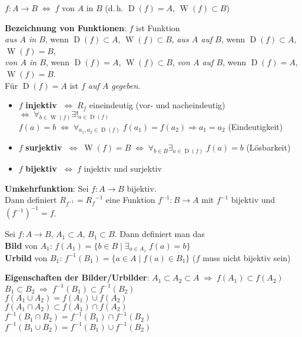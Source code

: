 $f: A \rightarrow B \;\Leftrightarrow\; f$ von $A$ in $B$
(d.\,h. $\operatorname{D}(f) = A$, $\operatorname{W}(f) \subset B$)

\textbf{Bezeichnung von Funktionen}: $f$ ist Funktion \\
\emph{aus $A$ in $B$}, wenn
$\operatorname{D}(f) \subset A$, $\operatorname{W}(f) \subset B$, \qquad
\emph{aus $A$ auf $B$}, wenn
$\operatorname{D}(f) \subset A$, $\operatorname{W}(f) = B$, \\
\emph{von $A$ in $B$}, wenn
$\operatorname{D}(f) = A$, $\operatorname{W}(f) \subset B$, \qquad
\emph{von $A$ auf $B$}, wenn
$\operatorname{D}(f) = A$, $\operatorname{W}(f) = B$. \\
Für $\operatorname{D}(f) = A$ ist \emph{$f$ auf $A$ gegeben}.

\linie

\begin{itemize}
    \item $f$ \textbf{injektiv}
    $\;\Leftrightarrow\; R_f$ eineindeutig (vor- und nacheindeutig) \\
    $\Leftrightarrow\; \forall_{b \in \operatorname{W}(f)}
    \exists!_{a \in \operatorname{D}(f)} $
    $f(a) = b \;\Leftrightarrow\; \forall_{a_1, a_2 \in \operatorname{D}(f)}\;
    f(a_1) = f(a_2) \Rightarrow a_1 = a_2$ (Eindeutigkeit)

    \item $f$ \textbf{surjektiv}
    $\;\Leftrightarrow\; \operatorname{W}(f) = B \;\Leftrightarrow\;
    \forall_{b \in B} \exists_{a \in \operatorname{D}(f)}\; f(a) = b$
    (Lösbarkeit)

    \item $f$ \textbf{bijektiv} $\;\Leftrightarrow\; f$ injektiv und surjektiv
\end{itemize}

\textbf{Umkehrfunktion}: Sei $f: A \rightarrow B$ bijektiv. \\
Dann definiert
$R_{f^{-1}} = {R_f}^{-1}$ eine Funktion $f^{-1}: B \rightarrow A$ mit
$f^{-1}$ bijektiv und $(f^{-1})^{-1} = f$.

\linie

Sei $f: A \rightarrow B$, $A_1 \subset A$, $B_1 \subset B$. Dann definiert man
das \\
\textbf{Bild} von $A_1$:
$f(A_1) = \{b \in B \;|\; \exists_{a \in A_1}\; f(a) = b\}$ \\
\textbf{Urbild} von $B_1$:
$f^{-1}(B_1) = \{a \in A \;|\; f(a) \in B_1\}$
($f$ muss nicht bijektiv sein)

\textbf{Eigenschaften der Bilder/Urbilder}:
$A_1 \subset A_2 \subset A \;\Rightarrow\; f(A_1) \subset f(A_2)$ \\
$B_1 \subset B_2 \;\Rightarrow\; f^{-1}(B_1) \subset f^{-1}(B_2)$ \\
$f(A_1 \cup A_2) = f(A_1) \cup f(A_2)$ \\
$f(A_1 \cap A_2) \subset f(A_1) \cap f(A_2)$ \\
$f^{-1}(B_1 \cap B_2) = f^{-1}(B_1) \cap f^{-1}(B_2)$ \\
$f^{-1}(B_1 \cup B_2) = f^{-1}(B_1) \cup f^{-1}(B_2)$

